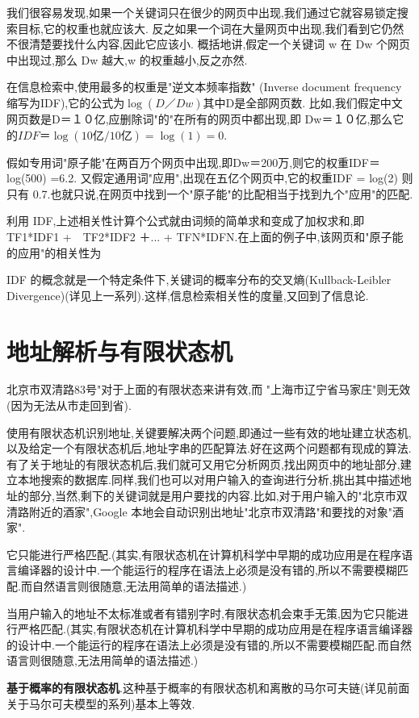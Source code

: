 \documentclass{article}
\begin{document}
我们很容易发现,如果一个关键词只在很少的网页中出现,我们通过它就容易锁定搜索目标,它的权重也就应该大.
反之如果一个词在大量网页中出现,我们看到它仍然不很清楚要找什么内容,因此它应该小.
概括地讲,假定一个关键词 w 在 Dw 个网页中出现过,那么 Dw 越大,w 的权重越小,反之亦然.

在信息检索中,使用最多的权重是"逆文本频率指数" (Inverse document frequency 缩写为IDF),它的公式为$\log(D／Dw)$其中D是全部网页数.
比如,我们假定中文网页数是D＝１０亿,应删除词"的"在所有的网页中都出现,即 Dw＝１０亿,那么它的$IDF＝\log(10亿/10亿)= \log (1) = 0$.

假如专用词"原子能"在两百万个网页中出现,即Dw＝200万,则它的权重IDF＝log(500) =6.2.
又假定通用词"应用",出现在五亿个网页中,它的权重IDF = log(2) 则只有 0.7.也就只说,在网页中找到一个"原子能"的比配相当于找到九个"应用"的匹配.

利用 IDF,上述相关性计算个公式就由词频的简单求和变成了加权求和,即 TF1*IDF1 +　TF2*IDF2 ＋... + TFN*IDFN.在上面的例子中,该网页和"原子能的应用"的相关性为

IDF 的概念就是一个特定条件下,关键词的概率分布的交叉熵(Kullback-Leibler Divergence)(详见上一系列).这样,信息检索相关性的度量,又回到了信息论.

\section{地址解析与有限状态机}
北京市双清路83号"对于上面的有限状态来讲有效,而 "上海市辽宁省马家庄"则无效(因为无法从市走回到省).

使用有限状态机识别地址,关键要解决两个问题,即通过一些有效的地址建立状态机,以及给定一个有限状态机后,地址字串的匹配算法.好在这两个问题都有现成的算法.有了关于地址的有限状态机后,我们就可又用它分析网页,找出网页中的地址部分,建立本地搜索的数据库.同样,我们也可以对用户输入的查询进行分析,挑出其中描述地址的部分,当然,剩下的关键词就是用户要找的内容.比如,对于用户输入的"北京市双清路附近的酒家",Google 本地会自动识别出地址"北京市双清路"和要找的对象"酒家".

它只能进行严格匹配.(其实,有限状态机在计算机科学中早期的成功应用是在程序语言编译器的设计中.一个能运行的程序在语法上必须是没有错的,所以不需要模糊匹配.而自然语言则很随意,无法用简单的语法描述.)

当用户输入的地址不太标准或者有错别字时,有限状态机会束手无策,因为它只能进行严格匹配.(其实,有限状态机在计算机科学中早期的成功应用是在程序语言编译器的设计中.一个能运行的程序在语法上必须是没有错的,所以不需要模糊匹配.而自然语言则很随意,无法用简单的语法描述.)

\textbf{基于概率的有限状态机}.这种基于概率的有限状态机和离散的马尔可夫链(详见前面关于马尔可夫模型的系列)基本上等效.
\end{document}
